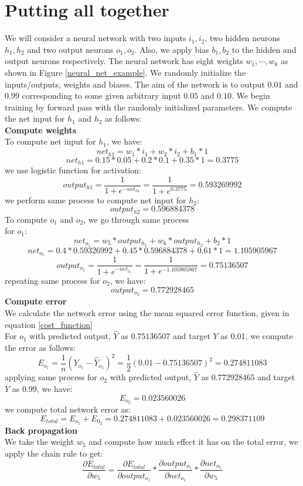 \documentclass[master]{thesis-uestc}
\begin{document}
\section{Putting all together}
We will consider a neural network with two inputs $i_1, i_2$, two hidden neurons $h_1, h_2$ and two output neurons $o_1, o_2$. Also, we apply bias $b_1, b_2$ to the hidden and output neurons respectively. The neural network has eight weights $w_1, \cdots, w_8$ as shown in Figure \ref{neural_net_example}. We randomly initialize the inputs/outputs, weights and biases. The aim of the network is to output $0.01$ and $0.99$ corresponding to some given arbitrary input $0.05$ and $0.10$.
We begin training by forward pass with the randomly initialized parameters. We compute the net input for $h_1$ and $h_2$ as follows:\\
\textbf{Compute weights} \\
To compute net input for $h_1$, we have:
\[net_{h1} = w_1 * i_1 + w_2 * i_2 + b_1 * 1\]
\[net_{h1} = 0.15 * 0.05 + 0.2 * 0.1 + 0.35 * 1 = 0.3775\]
we use logistic function for activation:
\[output_{h1} = \frac{1}{1 + e^{-net_{h1}}} = \frac{1}{1 + e^{0.3775}} = 0.593269992\]
we perform same process to compute net input for $h_2$:
\[output_{h2} = 0.596884378\]
To compute $o_1$ and $o_2$, we go through same process\\
for $o_1$:
\[net_{o_1} = w_5 * output_{h_1} + w_6 * output_{h_2} + b_2 * 1\]
\[net_{o_1} = 0.4 * 0.59326992 + 0.45 * 0.596884378 + 0.61 * 1 = 1.105905967\]
\[output_{o_1} = \frac{1}{1 + e^{-net_{o_1}}} = \frac{1}{1 + e^{-1.105905967}} = 0.75136507\]
repeating same process for $o_2$, we have:
\[output_{o_2} = 0.772928465 \]
\textbf{Compute error} \\
We calculate the network error using the mean squared error function, given in equation \ref{cost_function}\\
For $o_1$ with predicted output, $\hat{Y}$ as $0.75136507$ and target $Y$ as 0.01, we compute the error as follows:
\[E_{o_1} = \frac{1}{n}(Y_{o_1} - \hat{Y}_{o_1})^2 = \frac{1}{2}(0.01 - 0.75136507)^2 = 0.274811083\]
applying same process for $o_2$ with predicted output, $\hat{Y}$ as $0.772928465$ and target $Y$ as 0.99, we have:
\[E_{o_2} = 0.023560026\]
we compute total network error as:
\[E_{total} = E_{o_1} + E_{0_2} = 0.274811083 + 0.023560026 = 0.298371109\]
\textbf{Back propagation} \\
We take the weight $w_5$ and compute how much effect it has on the total error, we apply the chain rule to get:
\[\frac{\partial E_{total}}{\partial w_5} = \frac{\partial E_{total}}{\partial output_{o_1}} * \frac{\partial output_{o_1}}{\partial net_{o_1}} * \frac{\partial net_{o_1}}{\partial w_5}\]
\end{document}
